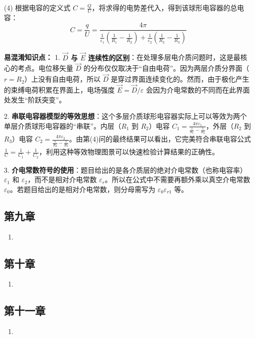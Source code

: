 \begin{enumerate}
	(4) 根据电容的定义式 $C = \frac{Q}{U}$，将求得的电势差代入，得到该球形电容器的总电容：
	\begin{equation}\label{eq:L8-2-6}
		C = \frac{q}{U} = \frac{4\pi}{\frac{1}{\varepsilon_1}\left(\frac{1}{R_1} - \frac{1}{R_2}\right) + \frac{1}{\varepsilon_2}\left(\frac{1}{R_2} - \frac{1}{R_3}\right)}
	\end{equation}
	
	\textbf{易混淆知识点： }
	1. \textbf{$\vec{D}$ 与 $\vec{E}$ 连续性的区别}：在处理多层电介质问题时，这是最核心的考点。电位移矢量 $\vec{D}$ 的分布仅仅取决于“自由电荷”。因为两层介质分界面（$r=R_2$）上没有自由电荷，所以 $\vec{D}$ 是穿过界面连续变化的。然而，由于极化产生的束缚电荷积累在界面上，电场强度 $\vec{E} = \vec{D}/\varepsilon$ 会因为介电常数的不同而在此界面处发生“阶跃突变”。
	
	2. \textbf{串联电容器模型的等效思想}：这个多层介质球形电容器实际上可以等效为两个单层介质球形电容器的“串联”。内层（$R_1$ 到 $R_2$）电容 $C_1 = \frac{4\pi\varepsilon_1}{\frac{1}{R_1} - \frac{1}{R_2}}$，外层（$R_2$ 到 $R_3$）电容 $C_2 = \frac{4\pi\varepsilon_2}{\frac{1}{R_2} - \frac{1}{R_3}}$。由第(4)问的最终结果可以看出，它完美符合串联电容公式 $\frac{1}{C} = \frac{1}{C_1} + \frac{1}{C_2}$，利用这种等效物理图景可以快速检验计算结果的正确性。
	
	3. \textbf{介电常数符号的使用}：题目给出的是各介质层的绝对介电常数（也称电容率） $\varepsilon_1$ 和 $\varepsilon_2$，而不是相对介电常数 $\varepsilon_r$。所以在公式中不需要再额外乘以真空介电常数 $\varepsilon_0$。若题目给出的是相对介电常数，则分母需写为 $\varepsilon_0 \varepsilon_{r1}$ 等。

\end{enumerate}

\newpage

\subsection{第九章}
\begin{enumerate}
	\item 
\end{enumerate}

\newpage

\subsection{第十章}
\begin{enumerate}
	\item 
\end{enumerate}

\newpage

\subsection{第十一章}
\begin{enumerate}
	\item 
\end{enumerate}












